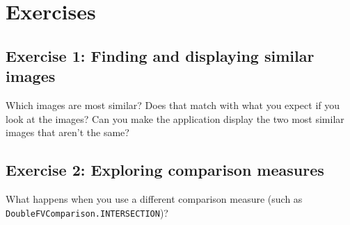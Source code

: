 \documentclass[10pt,a4paper,twoside,extrafontsizes]{memoir}
\begin{document}
\section*{Exercises}
\subsection*{Exercise 1: Finding and displaying similar images}
Which images are most similar?  Does that match with what you expect if you look at the 
images?  Can you make the application display the two most similar images that aren't the same?

\subsection*{Exercise 2: Exploring comparison measures}
\raggedright
What happens when you use a different comparison measure (such as 
\verb+DoubleFVComparison.INTERSECTION+)?
\end{document}
